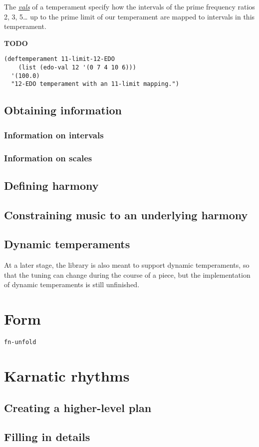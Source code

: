 \documentclass[11pt]{article}
\begin{document}
The \href{https://en.xen.wiki/w/Val}{\emph{vals}} of a temperament specify how the intervals of the prime frequency ratios 2, 3,
5\ldots{} up to the prime limit of our temperament are mapped to intervals in this temperament. 

\textbf{TODO}


\begin{verbatim}
(deftemperament 11-limit-12-EDO
    (list (edo-val 12 '(0 7 4 10 6)))
  '(100.0)
  "12-EDO temperament with an 11-limit mapping.")
\end{verbatim}


\subsection{Obtaining information}
\label{sec:org0eece02}

\subsubsection{Information on intervals}
\label{sec:org4d1a28d}


\subsubsection{Information on scales}
\label{sec:orgfd81786}


\subsection{Defining harmony}
\label{sec:org060ec8c}


\subsection{Constraining music to an underlying harmony}
\label{sec:org3196540}



\subsection{Dynamic temperaments}
\label{sec:orgc21e3e7}

At a later stage, the library is also meant to support dynamic temperaments, so that the tuning
can change during the course of a piece, but the implementation of dynamic temperaments is
still unfinished.



\section{Form}
\label{sec:org7329001}

\texttt{fn-unfold} 



\section{Karnatic rhythms}
\label{sec:orgcd6f1c7}

\subsection{Creating a higher-level plan}
\label{sec:org6657e6c}


\subsection{Filling in details}
\label{sec:org7dc8406}
\end{document}
